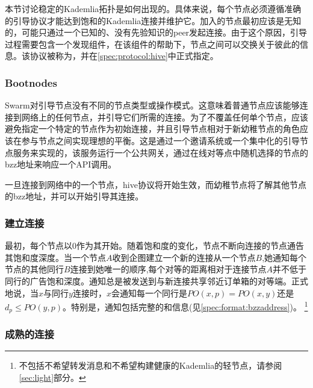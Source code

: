 本节讨论稳定的Kademlia拓扑是如何出现的。具体来说，每个节点必须遵循准确的引导协议才能达到饱和的Kademlia连接并维护它。加入的节点最初应该是无知的，可能只通过一个已知的、没有先验知识的peer发起连接。由于这个原因，引导过程需要包含一个发现组件，在该组件的帮助下，节点之间可以交换关于彼此的信息。该协议被称为，并在\ref{spec:protocol:hive}中正式指定。

\subsubsection{Bootnodes}

Swarm对引导节点没有不同的节点类型或操作模式。这意味着普通节点应该能够连接到网络上的任何节点，并引导它们所需的连接。为了不覆盖任何单个节点，应该避免指定一个特定的节点作为初始连接，并且引导节点相对于新幼稚节点的角色应该在参与节点之间实现理想的平衡。这是通过一个邀请系统或一个集中化的引导节点服务来实现的，该服务运行一个公共网关，通过在线对等点中随机选择的节点的bzz地址来响应一个API调用。

一旦连接到网络中的一个节点，hive协议将开始生效，而幼稚节点将了解其他节点的bzz地址，并可以开始引导其连接。

\subsubsection{建立连接}

最初，每个节点以0作为其开始。随着饱和度的变化，节点不断向连接的节点通告其饱和度深度。当一个节点$A$收到企图建立一个新的连接从一个节点$B$,她通知每个节点的其他同行$B$连接到她唯一的顺序,每个对等的距离相对于连接节点$A$并不低于同行的广告饱和深度。通知总是被发送到与新连接共享邻近订单箱的对等端。正式地说，当$x$与同行$y$连接时，$x$会通知每一个同行是$\mathit{PO}(x, p) = \mathit{PO}(x, y)$还是$d_p\leq \mathit{PO}(y, p)$。特别是，通知包括完整的和信息(见\ref{spec:format:bzzaddress})。%
%
\footnote{不包括不希望转发消息和不希望构建健康的Kademlia的轻节点，请参阅\ref{sec:light}部分。 }

    


\subsubsection{成熟的连接}

